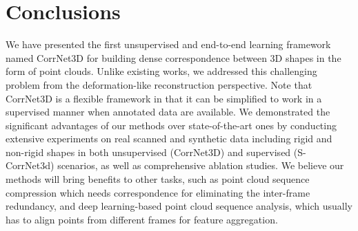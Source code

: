 \documentclass[final]{cvpr}
\begin{document}
\section{Conclusions}
We have presented the first unsupervised and end-to-end learning framework named CorrNet3D for building dense correspondence between 3D shapes in the form of point clouds. Unlike existing works, we addressed this challenging problem from the deformation-like reconstruction perspective.  Note that CorrNet3D is a flexible framework in that it can be simplified to work in a supervised manner when annotated data are available.
We demonstrated the significant advantages of our methods over state-of-the-art ones by conducting extensive experiments on real scanned and synthetic data including rigid and non-rigid shapes in both unsupervised (CorrNet3D) and supervised (S-CorrNet3d) scenarios, as well as comprehensive ablation studies. 
We believe our methods will bring benefits to other tasks, such as point cloud sequence compression which needs correspondence for eliminating the inter-frame redundancy, and deep learning-based point cloud sequence analysis, which usually has to align points from different frames for feature aggregation.  







{\small
\balance


}
\end{document}
